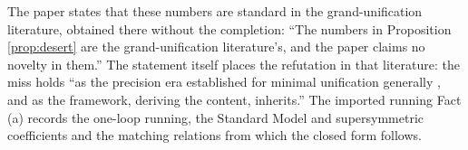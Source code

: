 The paper states that these numbers are standard in the grand-unification literature, obtained there without the completion: ``The numbers in Proposition \ref{prop:desert} are the grand-unification literature's, and the paper claims no novelty in them.'' The statement itself places the refutation in that literature: the miss holds ``as the precision era established for minimal unification generally \cite{Amaldi1991}, and as the framework, deriving the content, inherits.'' The imported running Fact (a) records the one-loop running, the Standard Model and supersymmetric coefficients and the matching relations from which the closed form follows.
